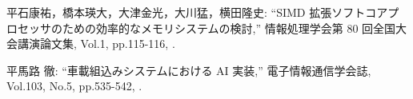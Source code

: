 {\small 平石康祐，橋本瑛大，大津金光，大川猛，横田隆史:      %
\newblock ``SIMD 拡張ソフトコアプロセッサのための効率的なメモリシステムの検討,''
\newblock 情報処理学会第 80 回全国大会講演論文集,
\newblock Vol.1,
\newblock pp.115-116,
.}

{\small 平馬路 徹:      %
\newblock ``車載組込みシステムにおける AI 実装,''
\newblock 電子情報通信学会誌,
\newblock Vol.103,
\newblock No.5,
\newblock pp.535-542,
.}